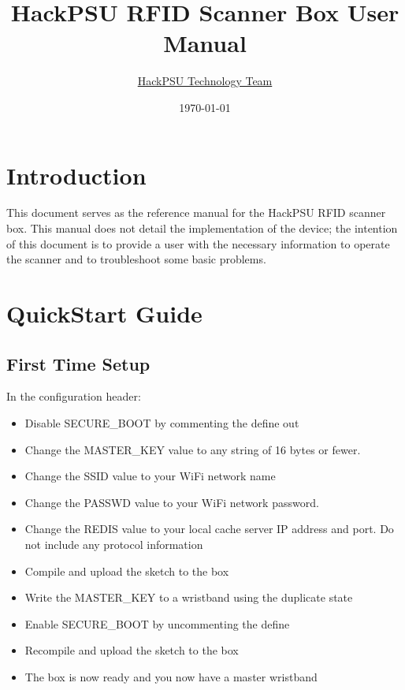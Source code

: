 \documentclass{article}
\title{HackPSU RFID Scanner Box User Manual}
\date{\today}
\author{ \href{mailto:technology@hackpsu.org}{HackPSU Technology Team}}
\begin{document}
\maketitle

\section*{Introduction}
This document serves as the reference manual for the HackPSU RFID scanner box.  This manual does not detail the implementation of the device; the intention of this document is to provide a user with the necessary information to operate the scanner and to troubleshoot some basic problems. 

\tableofcontents

\section{QuickStart Guide}
\subsection{First Time Setup}
In the configuration header:
\begin{itemize}
	\item Disable SECURE\_BOOT by commenting the define out
	\item Change the MASTER\_KEY value to any string of 16 bytes or fewer.
	\item Change the SSID value to your WiFi network name
	\item Change the PASSWD value to your WiFi network password.  
	\item Change the REDIS value to your local cache server IP address and port.  Do not include any protocol information
	\item Compile and upload the sketch to the box
	\item Write the MASTER\_KEY to a wristband using the duplicate state
	\item Enable SECURE\_BOOT by uncommenting the define
	\item Recompile and upload the sketch to the box
	\item The box is now ready and you now have a master wristband
\end{itemize}
\end{document}
